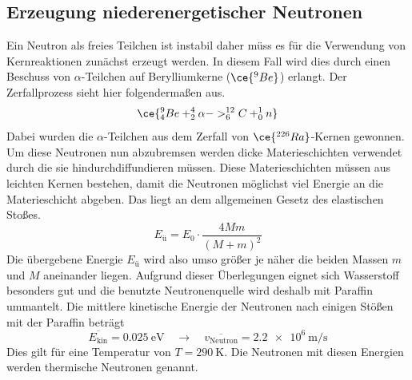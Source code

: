 \subsection{Erzeugung niederenergetischer Neutronen}
Ein Neutron als freies Teilchen ist instabil daher müss es für die Verwendung von Kernreaktionen zunächst erzeugt werden.
In diesem Fall wird dies durch einen Beschuss von $\alpha$-Teilchen auf Berylliumkerne ($\ce{^{9}Be}$) erlangt.
Der Zerfallprozess sieht hier folgendermaßen aus.
\begin{equation}
\ce{^{9}_{4}Be + ^{4}_{2}{\alpha} -> ^{12}_{6}C + ^{1}_{0}n}
\end{equation}
Dabei wurden die $\alpha$-Teilchen aus dem Zerfall von $\ce{^{226}Ra}$-Kernen gewonnen. Um diese Neutronen nun abzubremsen werden dicke Materieschichten verwendet durch die sie hindurchdiffundieren müssen.
Diese Materieschichten müssen aus leichten Kernen bestehen, damit die Neutronen möglichst viel Energie an die Materieschicht abgeben. Das liegt an dem allgemeinen Gesetz
des elastischen Stoßes.
\begin{equation}
E_{ü} = E_{0} \cdot \frac{4Mm}{(M+m)^{2}}
\end{equation}
Die übergebene Energie $E_{ü}$ wird also umso größer je näher die beiden Massen $m$ und $M$ aneinander liegen.
Aufgrund dieser Überlegungen eignet sich Wasserstoff besonders gut und die benutzte Neutronenquelle wird deshalb mit Paraffin ummantelt.
Die mittlere kinetische Energie der Neutronen nach einigen Stößen mit der Paraffin beträgt
\begin{equation*}
\overline{E_{\text{kin}}} = \SI{0.025}{\electronvolt} \quad \to \quad \overline{v_{\text{Neutron}}} = \SI{2.2e6}{\meter\per\second}
\end{equation*}
Dies gilt für eine Temperatur von $T = \SI{290}{\kelvin}$. Die Neutronen mit diesen Energien werden thermische Neutronen genannt.

